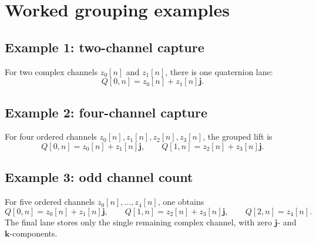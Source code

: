 \documentclass[11pt]{article}
\theoremstyle{remark}
\newcommand{\jj}{\mathbf{j}}
\newcommand{\kk}{\mathbf{k}}
\begin{document}
\section{Worked grouping examples}

\subsection*{Example 1: two-channel capture}

For two complex channels \(z_0[n]\) and \(z_1[n]\), there is one quaternion lane:
\[
Q[0,n]=z_0[n]+z_1[n]\jj.
\]

\subsection*{Example 2: four-channel capture}

For four ordered channels \(z_0[n],z_1[n],z_2[n],z_3[n]\), the grouped lift is
\[
Q[0,n]=z_0[n]+z_1[n]\jj,
\qquad
Q[1,n]=z_2[n]+z_3[n]\jj.
\]

\subsection*{Example 3: odd channel count}

For five ordered channels \(z_0[n],\dots,z_4[n]\), one obtains
\[
Q[0,n]=z_0[n]+z_1[n]\jj,
\qquad
Q[1,n]=z_2[n]+z_3[n]\jj,
\qquad
Q[2,n]=z_4[n].
\]
The final lane stores only the single remaining complex channel, with zero \(\jj\)- and \(\kk\)-components.



\end{document}
